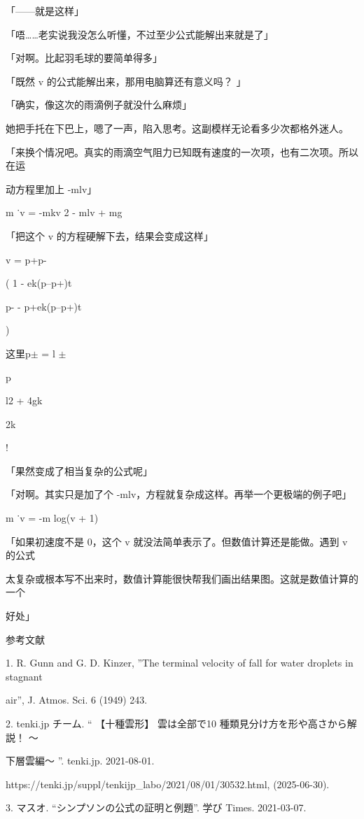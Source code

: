 「——就是这样」\par
「唔……老实说我没怎么听懂，不过至少公式能解出来就是了」\par
「对啊。比起羽毛球的要简单得多」\par
「既然 v 的公式能解出来，那用电脑算还有意义吗？ 」\par
「确实，像这次的雨滴例子就没什么麻烦」\par
她把手托在下巴上，嗯了一声，陷入思考。这副模样无论看多少次都格外迷人。\par
「来换个情况吧。真实的雨滴空气阻力已知既有速度的一次项，也有二次项。所以在运\par
动方程里加上 -mlv」\par
m ˙v = -mkv 2 - mlv + mg\par
「把这个 v 的方程硬解下去，结果会变成这样」\par
v = p+p-\par
( 1 - ek(p--p+)t\par
p- - p+ek(p--p+)t\par
)\par
这里p$\pm$ = l $\pm$\par
p\par
l2 + 4gk\par
2k\par
!\par
「果然变成了相当复杂的公式呢」\par
「对啊。其实只是加了个 -mlv，方程就复杂成这样。再举一个更极端的例子吧」\par
m ˙v = -m log(v + 1)\par
「如果初速度不是 0，这个 v 就没法简单表示了。但数值计算还是能做。遇到 v 的公式\par
太复杂或根本写不出来时，数值计算能很快帮我们画出结果图。这就是数值计算的一个\par
好处」\par
参考文献\par
1. R. Gunn and G. D. Kinzer, ”The terminal velocity of fall for water droplets in stagnant\par
air”, J. Atmos. Sci. 6 (1949) 243.\par
2. tenki.jp チーム. “ 【十種雲形】 雲は全部で10 種類見分け方を形や高さから解説！ ～\par
下層雲編～ ”. tenki.jp. 2021-08-01.\par
https://tenki.jp/suppl/tenkijp\_labo/2021/08/01/30532.html, (2025-06-30).\par
3. マスオ. “シンプソンの公式の証明と例題”. 学び Times. 2021-03-07.\par


